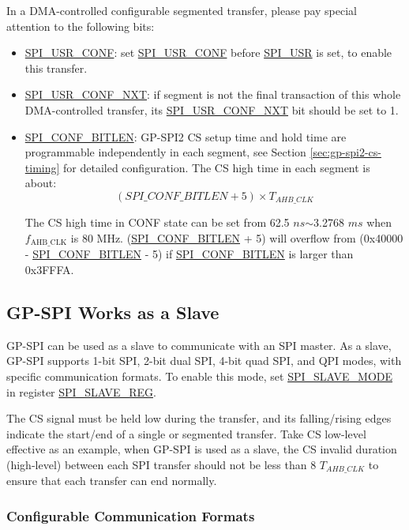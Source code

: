 \documentclass[main\_\_EN.tex]{subfiles}
\begin{document}
In a DMA-controlled configurable segmented transfer, please pay special attention to the following bits:
\begin{itemize}
    \item \hyperref[fielddesc:SPIUSRCONF]{SPI\_USR\_CONF}: set \hyperref[fielddesc:SPIUSRCONF]{SPI\_USR\_CONF} before \hyperref[fielddesc:SPIUSR]{SPI\_USR} is set, to enable this transfer.
    \item \hyperref[fielddesc:SPIUSRCONFNXT]{SPI\_USR\_CONF\_NXT}: if segment  is not the final transaction of this whole DMA-controlled transfer, its \hyperref[fielddesc:SPIUSRCONFNXT]{SPI\_USR\_CONF\_NXT} bit should be set to 1.
    \item \hyperref[fielddesc:SPICONFBITLEN]{SPI\_CONF\_BITLEN}: GP-SPI2 CS setup time and hold time are programmable independently in each segment, see Section \ref{sec:gp-spi2-cs-timing} for detailed configuration. The CS high time in each segment is about:
    \[
    (\hyperref[fielddesc:SPICONFBITLEN]{SPI\_CONF\_BITLEN} + 5) \times T_{AHB\_CLK}
    \]

The CS high time in CONF state can be set from 62.5 $ns$$\sim$3.2768 $ms$ when $f_{\textrm{AHB\_CLK}}$  is 80 MHz.
(\hyperref[fielddesc:SPICONFBITLEN]{SPI\_CONF\_BITLEN} + 5) will overflow from (0x40000 - \hyperref[fielddesc:SPICONFBITLEN]{SPI\_CONF\_BITLEN} - 5) if \hyperref[fielddesc:SPICONFBITLEN]{SPI\_CONF\_BITLEN} is larger than 0x3FFFA.
\end{itemize}

\subsection{GP-SPI Works as a Slave}\label{sec:gp-spi2-slave-mode}

GP-SPI can be used as a slave to communicate with an SPI master. As a slave, GP-SPI supports 1-bit SPI, 2-bit dual SPI, 4-bit quad SPI, and QPI modes, with specific communication formats. To enable this mode, set \hyperref[fielddesc:SPISLAVEMODE]{SPI\_SLAVE\_MODE} in register \hyperref[regdesc:SPISLAVEREG]{SPI\_SLAVE\_REG}.

The CS signal must be held low during the transfer, and its falling/rising edges indicate the start/end of a single or segmented transfer. Take CS low-level effective as an example, when GP-SPI is used as a slave, the CS invalid duration (high-level) between each SPI transfer should not be less than 8 $T_{AHB\_CLK}$ to ensure that each transfer can end normally.

\subsubsection{Configurable Communication Formats}\label{slave communication format}
\end{document}
